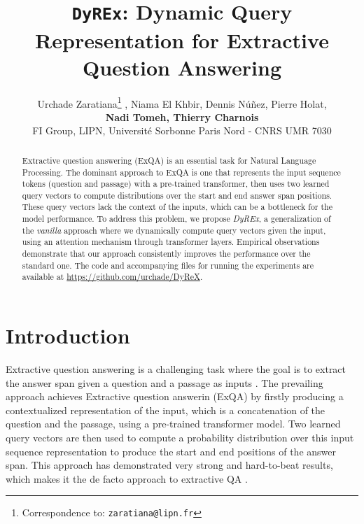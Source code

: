 \documentclass{article}
\title{\texttt{DyREx}: Dynamic Query Representation for Extractive Question Answering}
\author{Urchade Zaratiana\thanks{Correspondence to: \texttt{zaratiana@lipn.fr}} , Niama El Khbir, Dennis Núñez, Pierre Holat, \\ \textbf{Nadi Tomeh, Thierry Charnois} \\
  FI Group, LIPN, Université Sorbonne Paris Nord - CNRS UMR 7030
}
\begin{document}
\maketitle

\renewcommand{\arraystretch}{1.3}

\begin{abstract}
Extractive question answering (ExQA) is an essential task for Natural Language Processing. The dominant approach to ExQA is one that represents the input sequence tokens (question and passage) with a pre-trained transformer, then uses two learned query vectors to compute distributions over the start and end answer span positions. These query vectors lack the context of the inputs, which can be a bottleneck for the model performance. To address this problem, we propose \textit{DyREx}, a generalization of the \textit{vanilla} approach where we dynamically compute query vectors given the input, using an attention mechanism through transformer layers. Empirical observations demonstrate that our approach consistently improves the performance over the standard one. The code and accompanying files for running the experiments are available at \url{https://github.com/urchade/DyReX}.
\end{abstract}

\section{Introduction}

Extractive question answering is a challenging task where the goal is to extract the answer span given a question and a passage as inputs \citep{SQuAD, NaturalQs}. The prevailing approach achieves Extractive question answerin (ExQA) by firstly producing a contextualized representation of the input, which is a concatenation of the question and the passage, using a pre-trained transformer model. Two learned query vectors are then used to compute a probability distribution over this input sequence representation to produce the start and end positions of the answer span.
This approach has demonstrated very strong and hard-to-beat results, which makes it the de facto approach to extractive QA
\citep{BERT, RoBERTa, span_BERT}. 
\end{document}
